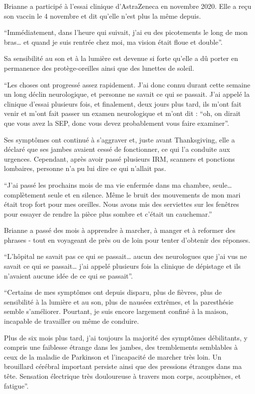 Brianne a participé à l'essai clinique d'AstraZeneca en novembre 2020. Elle a
reçu son vaccin le 4 novembre et dit qu'elle n'est plus la même depuis.

“Immédiatement, dans l'heure qui suivait, j'ai eu des picotements le long de mon
bras… et quand je suis rentrée chez moi, ma vision était floue et double”.

Sa sensibilité au son et à la lumière est devenue si forte qu'elle a dû porter
en permanence des protège-oreilles ainsi que des lunettes de soleil.

“Les choses ont progressé assez rapidement. J'ai donc connu durant cette semaine
un long déclin neurologique, et personne ne savait ce qui se passait. J'ai
appelé la clinique d'essai plusieurs fois, et finalement, deux jours plus tard,
ils m'ont fait venir et m'ont fait passer un examen neurologique et m'ont dit :
“oh, on dirait que vous avez la SEP, donc vous devez probablement vous faire
examiner”.

Ses symptômes ont continué à s'aggraver et, juste avant Thanksgiving, elle a
déclaré que ses jambes avaient cessé de fonctionner, ce qui l'a conduite aux
urgences. Cependant, après avoir passé plusieurs IRM, scanners et ponctions
lombaires, personne n'a pu lui dire ce qui n'allait pas.

“J'ai passé les prochains mois de ma vie enfermée dans ma chambre, seule…
complètement seule et en silence. Même le bruit des mouvements de mon mari était
trop fort pour mes oreilles. Nous avons mis des serviettes sur les fenêtres pour
essayer de rendre la pièce plus sombre et c'était un cauchemar.”

Brianne a passé des mois à apprendre à marcher, à manger et à reformer des
phrases - tout en voyageant de près ou de loin pour tenter d'obtenir des
réponses.

“L'hôpital ne savait pas ce qui se passait… aucun des neurologues que j'ai vus
ne savait ce qui se passait… j'ai appelé plusieurs fois la clinique de dépistage
et ils n'avaient aucune idée de ce qui se passait”.

“Certains de mes symptômes ont depuis disparu, plus de fièvres, plus de
sensibilité à la lumière et au son, plus de nausées extrêmes, et la paresthésie
semble s'améliorer. Pourtant, je suis encore largement confiné à la maison,
incapable de travailler ou même de conduire.

Plus de six mois plus tard, j'ai toujours la majorité des symptômes débilitants,
y compris une faiblesse étrange dans les jambes, des tremblements semblables à
ceux de la maladie de Parkinson et l'incapacité de marcher très loin. Un
brouillard cérébral important persiste ainsi que des pressions étranges dans ma
tête. Sensation électrique très douloureuse à travers mon corps, acouphènes, et
fatigue”.

